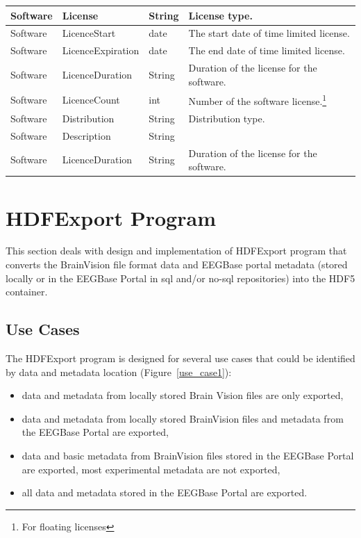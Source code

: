 \documentclass[conference]{IEEEtran}
\begin{document}
\begin{savenotes}
\begin{table}
\begin{tabular}{ | l | l | l | p{3cm} |}
 	\hline
 	Software & License & String & License type.\\
 	\hline
 	Software & LicenceStart & date & The start date of time limited license.\\ 		\hline
 	Software & LicenceExpiration & date & The end date of time limited license.\\ 		\hline
 	Software & LicenceDuration & String & Duration of the license for the software.\\ 		\hline
 	Software & LicenceCount & int & Number of the software license.\footnote{For floating licenses}\\ 		\hline
 	Software & Distribution & String & Distribution type.\\ 		\hline
 	Software & Description & String & \\ 		\hline
 	Software & LicenceDuration & String & Duration of the license for the software.\\ 		\hline
 \end{tabular}

 \end{table}
 \end{savenotes}

\section{HDFExport Program}

This section deals with design and implementation of HDFExport program that converts the BrainVision file format data and EEGBase portal metadata (stored locally or in the EEGBase Portal in sql and/or no-sql repositories) into the HDF5 container.

\subsection{Use Cases}
The HDFExport program is designed for several use cases that could be identified by data and metadata location (Figure~\ref{use_case1}):
\begin{itemize}
	\item data and metadata from locally stored Brain Vision files are only exported,
	\item data and metadata from locally stored BrainVision files  and metadata from the EEGBase Portal are exported,
	\item data and basic metadata from BrainVision files stored in the EEGBase Portal are exported, most experimental metadata are not exported,
	\item all data and metadata stored in the EEGBase Portal are exported.
\end{itemize}
\end{document}
